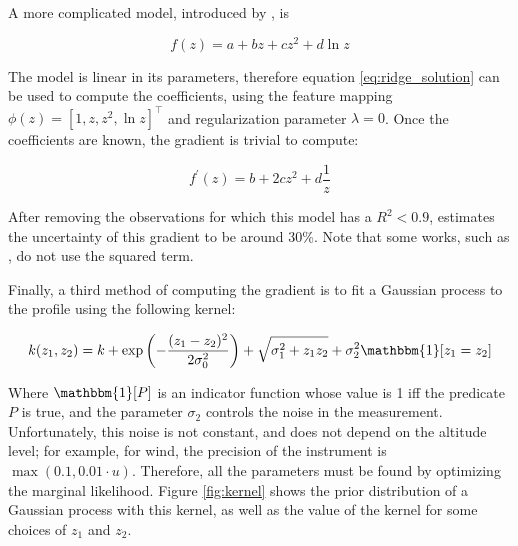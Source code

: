 \documentclass[12pt]{book}
\begin{document}
A more complicated model, introduced by \cite{windlogprofile}, is

\begin{equation}
\label{eq:logmodel}
f(z)=a+bz+cz^2+d\ln z
\end{equation}

The model is linear in its parameters, therefore equation \ref{eq:ridge_solution} can be used to compute the coefficients, using the feature mapping $\phi(z)=\left[1,z,z^2,\ln z\right]^\intercal$ and regularization parameter $\lambda=0$. Once the coefficients are known, the gradient is trivial to compute:

\begin{equation}
\label{eq:log_gradient}
f^\prime(z)=b+2cz^2+d\frac{1}{z}
\end{equation}

After removing the observations for which this model has a $R^2<0.9$, \cite{windlogprofile} estimates the uncertainty of this gradient to be around 30\%. Note that some works, such as \cite{windprof_nosqr}, do not use the squared term.

Finally, a third method of computing the gradient is to fit a Gaussian process to the profile using the following kernel:

\begin{equation}
\label{eq:kernel}
k(z_1,z_2)=k+\exp\left(-\frac{(z_1-z_2)^2}{2\sigma_0^2}\right)+\sqrt{\sigma_1^2+ z_1 z_2}+\sigma_2^2 \mathbbm{1}[z_1=z_2]
\end{equation}

Where $\mathbbm{1}[P]$ is an indicator function whose value is 1 iff the predicate $P$ is true, and the parameter $\sigma_2$ controls the noise in the measurement. Unfortunately, this noise is not constant, and does not depend on the altitude level; for example, for wind, the precision of the instrument is $\max(0.1,0.01\cdot u)$. Therefore, all the parameters must be found by optimizing the marginal likelihood. Figure \ref{fig:kernel} shows the prior distribution of a Gaussian process with this kernel, as well as the value of the kernel for some choices of $z_1$ and $z_2$.
\end{document}
